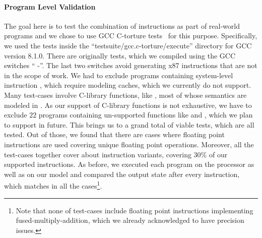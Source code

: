 \paragraph{Program Level Validation}
The goal here is to test the combination of instructions as part of real-world programs and we chose to use GCC C-torture tests~\cite{CTORTURE} for this purpose. Specifically, we used the tests inside the ``testsuite/gcc.c-torture/execute'' directory for GCC version 8.1.0.  
There are originally \TortureTotal{} tests, which we compiled using the GCC switches ``     -''. The last two switches avoid generating x87 instructions that are not in the scope of work. We had to exclude \TortureExclude{} programs containing system-level instruction , which require modeling caches, which we currently do not support. Many test-cases involve C-library functions, like , most of whose semantics are modeled in \K. As our support of C-library functions is not exhaustive, we have to exclude $22$ programs containing un-supported functions like  and , which we plan to support in future. This brings us to a grand total of \TortureInclude{} viable tests, which are all tested. Out of those, we found that there are \TortureUifsInstr{} cases where floating point instructions are used covering \TortureUifs{} unique floating point operations. Moreover, all the test-cases together cover about \TortureCoverage{} instruction variants, covering  $30\%$ of our supported instructions. As before, we executed each program on the processor as well as  on our model and compared the output state after every instruction, which matches in all the cases\footnote{Note that none of test-cases include floating point instructions implementing fused-multiply-addition, which we already acknowledged to have precision issues.}. 


